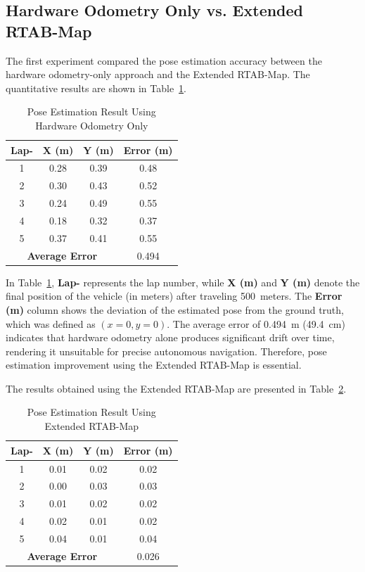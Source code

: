 \documentclass[conference, a4paper]{IEEEtran}
\begin{document}
\subsection{Hardware Odometry Only vs. Extended RTAB-Map} 
The first experiment compared the pose estimation accuracy between the hardware odometry-only approach and the Extended RTAB-Map. The quantitative results are shown in Table~\ref{tab:pose_estimation}.

\begin{table}[H]
	\centering
	\caption{Pose Estimation Result Using Hardware Odometry Only}
	\label{tab:pose_estimation}
	\begin{tabular}{|c|c|c|c|}
		\hline
		\textbf{Lap-} & \textbf{X (m)} & \textbf{Y (m)} & \textbf{Error (m)} \\ \hline
		1 & 0.28 & 0.39 & 0.48 \\ \hline
		2 & 0.30 & 0.43 & 0.52 \\ \hline
		3 & 0.24 & 0.49 & 0.55 \\ \hline
		4 & 0.18 & 0.32 & 0.37 \\ \hline
		5 & 0.37 & 0.41 & 0.55 \\ \hline
		\multicolumn{3}{|c|}{\textbf{Average Error}} & 0.494 \\ \hline
	\end{tabular}
\end{table}

In Table~\ref{tab:pose_estimation}, \textbf{Lap-} represents the lap number, while \textbf{X (m)} and \textbf{Y (m)} denote the final position of the vehicle (in meters) after traveling 500~meters. The \textbf{Error (m)} column shows the deviation of the estimated pose from the ground truth, which was defined as $(x=0, y=0)$. The average error of 0.494~m (49.4~cm) indicates that hardware odometry alone produces significant drift over time, rendering it unsuitable for precise autonomous navigation. Therefore, pose estimation improvement using the Extended RTAB-Map is essential.

\par
The results obtained using the Extended RTAB-Map are presented in Table~\ref{tab:pose_estimation_slam}.

\begin{table}[H]
	\centering
	\caption{Pose Estimation Result Using Extended RTAB-Map}
	\label{tab:pose_estimation_slam}
	\begin{tabular}{|c|c|c|c|}
		\hline
		\textbf{Lap-} & \textbf{X (m)} & \textbf{Y (m)} & \textbf{Error (m)} \\ \hline
		1 & 0.01 & 0.02 & 0.02 \\ \hline
		2 & 0.00 & 0.03 & 0.03 \\ \hline
		3 & 0.01 & 0.02 & 0.02 \\ \hline
		4 & 0.02 & 0.01 & 0.02 \\ \hline
		5 & 0.04 & 0.01 & 0.04 \\ \hline
		\multicolumn{3}{|c|}{\textbf{Average Error}} & 0.026 \\ \hline
	\end{tabular}
\end{table}
\end{document}
